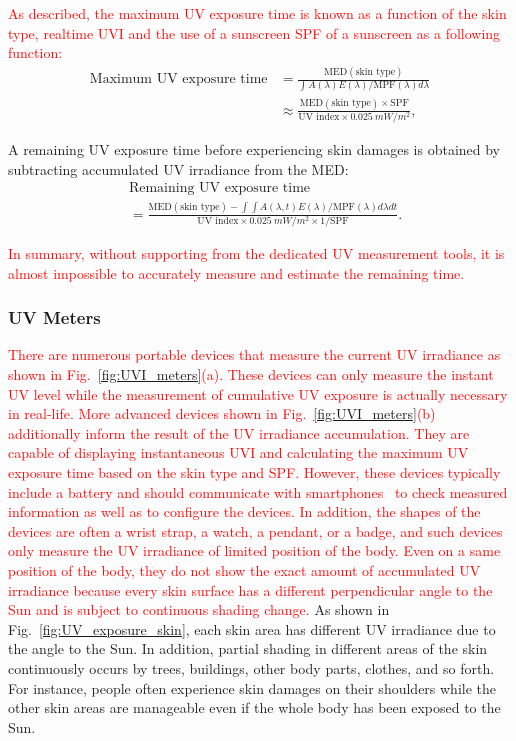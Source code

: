 \documentclass[journal]{IEEEtran}
\begin{document}
\textcolor{red}{As described, the maximum UV exposure time is known as a function of the skin type, realtime UVI and the use of a sunscreen SPF of a sunscreen as a following function:}
%
\begin{equation} \label{eq: max_exp_time}
\begin{split}
\text{Maximum~UV~exposure~time}
&= \frac{\text{MED}(\text{skin~type})}{\int A(\lambda)E(\lambda)  / \text{MPF}(\lambda) d \lambda} \\
&\approx \frac{\text{MED}(\text{skin~type})\times \text{SPF}}{\text{UV~index} \times 0.025~mW/m^2},
\end{split}
\end{equation}

A remaining UV exposure time before experiencing skin damages is obtained by subtracting accumulated UV irradiance from the MED:
%
\begin{equation}
\begin{split}
&\text{Remaining~UV~exposure~time} \\
&= \frac{\text{MED}(\text{skin~type}) - \int \int A(\lambda, t)E(\lambda) / \text{MPF}(\lambda) d \lambda dt}{\text{UV~index} \times 0.025~mW/m^2 \times 1/\text{SPF}}.
\end{split}
\end{equation}

\textcolor{red}{In summary, without supporting from the dedicated UV measurement tools, it is almost impossible to accurately measure and estimate the remaining time.}


\subsubsection{UV Meters}
\textcolor{red}{There are numerous portable devices that measure the current UV irradiance as shown in Fig.~\ref{fig:UVI_meters}(a).
These devices can only measure the instant UV level while the measurement of cumulative UV exposure is actually necessary in real-life. More advanced devices shown in Fig.~\ref{fig:UVI_meters}(b) additionally inform the result of the UV irradiance accumulation. They are capable of displaying instantaneous UVI and calculating the maximum UV exposure time based on the skin type and SPF.
However, these devices typically include a battery and should communicate with smartphones~\cite{Netatmo, Ultra} to check measured information as well as to configure the devices. In addition, the shapes of the devices are often a wrist strap, a watch, a pendant, or a badge, and such devices only measure the UV irradiance of limited position of the body. Even on a same position of the body, they do not show the exact amount of accumulated UV irradiance because every skin surface has a different perpendicular angle to the Sun and is subject to continuous shading change.}
%
As shown in Fig.~\ref{fig:UV_exposure_skin}, each skin area has different UV irradiance due to the angle to the Sun.
In addition, partial shading in different areas of the skin continuously occurs by trees, buildings, other body parts, clothes, and so forth. For instance, people often experience skin damages on their shoulders while the other skin areas are manageable even if the whole body has been exposed to the Sun.
\end{document}
